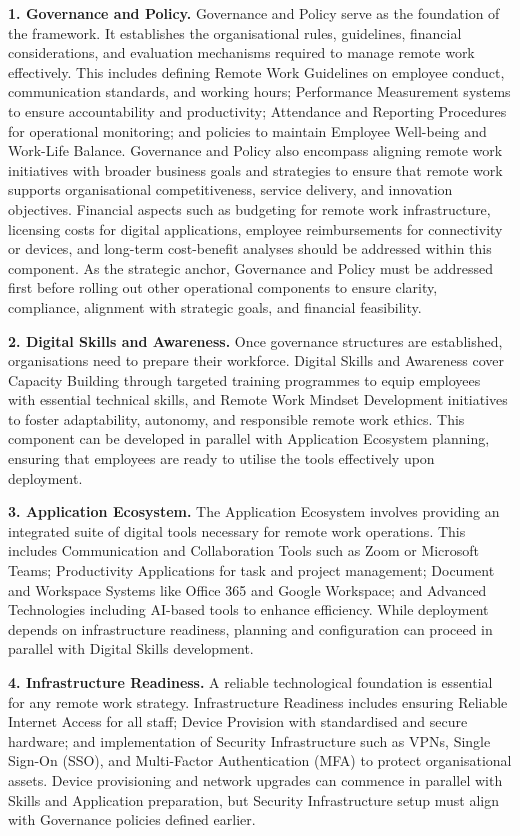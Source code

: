 \documentclass{infotel}
\begin{document}
\textbf{1. Governance and Policy.}  
Governance and Policy serve as the foundation of the framework. It establishes the organisational rules, guidelines, financial considerations, and evaluation mechanisms required to manage remote work effectively. This includes defining Remote Work Guidelines on employee conduct, communication standards, and working hours; Performance Measurement systems to ensure accountability and productivity; Attendance and Reporting Procedures for operational monitoring; and policies to maintain Employee Well-being and Work-Life Balance. Governance and Policy also encompass aligning remote work initiatives with broader business goals and strategies to ensure that remote work supports organisational competitiveness, service delivery, and innovation objectives. Financial aspects such as budgeting for remote work infrastructure, licensing costs for digital applications, employee reimbursements for connectivity or devices, and long-term cost-benefit analyses should be addressed within this component. As the strategic anchor, Governance and Policy must be addressed first before rolling out other operational components to ensure clarity, compliance, alignment with strategic goals, and financial feasibility.

\textbf{2. Digital Skills and Awareness.}  
Once governance structures are established, organisations need to prepare their workforce. Digital Skills and Awareness cover Capacity Building through targeted training programmes to equip employees with essential technical skills, and Remote Work Mindset Development initiatives to foster adaptability, autonomy, and responsible remote work ethics. This component can be developed in parallel with Application Ecosystem planning, ensuring that employees are ready to utilise the tools effectively upon deployment.

\textbf{3. Application Ecosystem.}  
The Application Ecosystem involves providing an integrated suite of digital tools necessary for remote work operations. This includes Communication and Collaboration Tools such as Zoom or Microsoft Teams; Productivity Applications for task and project management; Document and Workspace Systems like Office 365 and Google Workspace; and Advanced Technologies including AI-based tools to enhance efficiency. While deployment depends on infrastructure readiness, planning and configuration can proceed in parallel with Digital Skills development.

\textbf{4. Infrastructure Readiness.}  
A reliable technological foundation is essential for any remote work strategy. Infrastructure Readiness includes ensuring Reliable Internet Access for all staff; Device Provision with standardised and secure hardware; and implementation of Security Infrastructure such as VPNs, Single Sign-On (SSO), and Multi-Factor Authentication (MFA) to protect organisational assets. Device provisioning and network upgrades can commence in parallel with Skills and Application preparation, but Security Infrastructure setup must align with Governance policies defined earlier.
\end{document}
